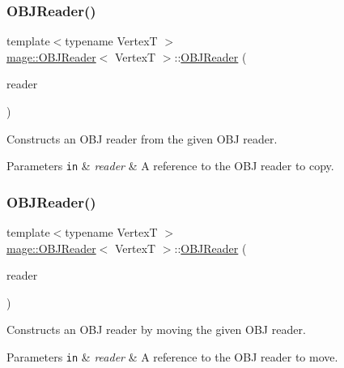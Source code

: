 \subsubsection{\texorpdfstring{O\+B\+J\+Reader()}{OBJReader()}\hspace{0.1cm}{\footnotesize\ttfamily [2/3]}}
{\footnotesize\ttfamily template$<$typename VertexT $>$ \\
\hyperlink{classmage_1_1_o_b_j_reader}{mage\+::\+O\+B\+J\+Reader}$<$ VertexT $>$\+::\hyperlink{classmage_1_1_o_b_j_reader}{O\+B\+J\+Reader} (\begin{DoxyParamCaption}\item[{const \hyperlink{classmage_1_1_o_b_j_reader}{O\+B\+J\+Reader}$<$ VertexT $>$ \&}]{reader }\end{DoxyParamCaption})\hspace{0.3cm}{\ttfamily [delete]}}

Constructs an O\+BJ reader from the given O\+BJ reader.


\begin{DoxyParams}[1]{Parameters}
\mbox{\tt in}  & {\em reader} & A reference to the O\+BJ reader to copy. \\
\hline
\end{DoxyParams}
\hypertarget{classmage_1_1_o_b_j_reader_aa17de8927d3d50e82a286302f34a1d33}{}\label{classmage_1_1_o_b_j_reader_aa17de8927d3d50e82a286302f34a1d33} 
\subsubsection{\texorpdfstring{O\+B\+J\+Reader()}{OBJReader()}\hspace{0.1cm}{\footnotesize\ttfamily [3/3]}}
{\footnotesize\ttfamily template$<$typename VertexT $>$ \\
\hyperlink{classmage_1_1_o_b_j_reader}{mage\+::\+O\+B\+J\+Reader}$<$ VertexT $>$\+::\hyperlink{classmage_1_1_o_b_j_reader}{O\+B\+J\+Reader} (\begin{DoxyParamCaption}\item[{\hyperlink{classmage_1_1_o_b_j_reader}{O\+B\+J\+Reader}$<$ VertexT $>$ \&\&}]{reader }\end{DoxyParamCaption})}

Constructs an O\+BJ reader by moving the given O\+BJ reader.


\begin{DoxyParams}[1]{Parameters}
\mbox{\tt in}  & {\em reader} & A reference to the O\+BJ reader to move. \\
\hline
\end{DoxyParams}
\hypertarget{classmage_1_1_o_b_j_reader_ad1ff7472ec560a29fe58b594d84dc43e}{}\label{classmage_1_1_o_b_j_reader_ad1ff7472ec560a29fe58b594d84dc43e} 
